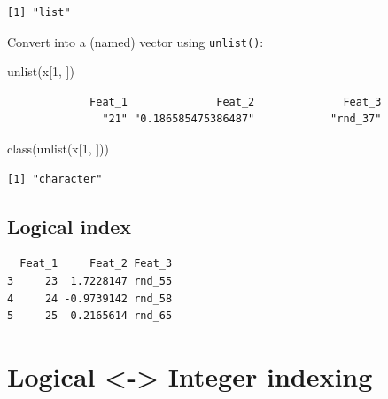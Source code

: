 \documentclass[
]{book}
\newenvironment{Shaded}{\begin{snugshade}}{\end{snugshade}}
\newcommand{\DecValTok}[1]{\textcolor[rgb]{0.00,0.00,0.81}{#1}}
\newcommand{\FunctionTok}[1]{\textcolor[rgb]{0.00,0.00,0.00}{#1}}
\newcommand{\NormalTok}[1]{#1}
\newcommand{\SpecialCharTok}[1]{\textcolor[rgb]{0.00,0.00,0.00}{#1}}
\begin{document}
\begin{verbatim}
[1] "list"
\end{verbatim}

Convert into a (named) vector using \texttt{unlist()}:

\begin{Shaded}
\begin{Highlighting}[]
\FunctionTok{unlist}\NormalTok{(x[}\DecValTok{1}\NormalTok{, ])}
\end{Highlighting}
\end{Shaded}

\begin{verbatim}
             Feat_1              Feat_2              Feat_3 
               "21" "0.186585475386487"            "rnd_37" 
\end{verbatim}

\begin{Shaded}
\begin{Highlighting}[]
\FunctionTok{class}\NormalTok{(}\FunctionTok{unlist}\NormalTok{(x[}\DecValTok{1}\NormalTok{, ]))}
\end{Highlighting}
\end{Shaded}

\begin{verbatim}
[1] "character"
\end{verbatim}

\hypertarget{dfidl}{%
\subsection{Logical index}\label{dfidl}}

\begin{Shaded}
\end{Shaded}

\begin{verbatim}
  Feat_1     Feat_2 Feat_3
3     23  1.7228147 rnd_55
4     24 -0.9739142 rnd_58
5     25  0.2165614 rnd_65
\end{verbatim}

\hypertarget{logical---integer-indexing}{%
\section{Logical \textless-\textgreater{} Integer indexing}\label{logical---integer-indexing}}
\end{document}
